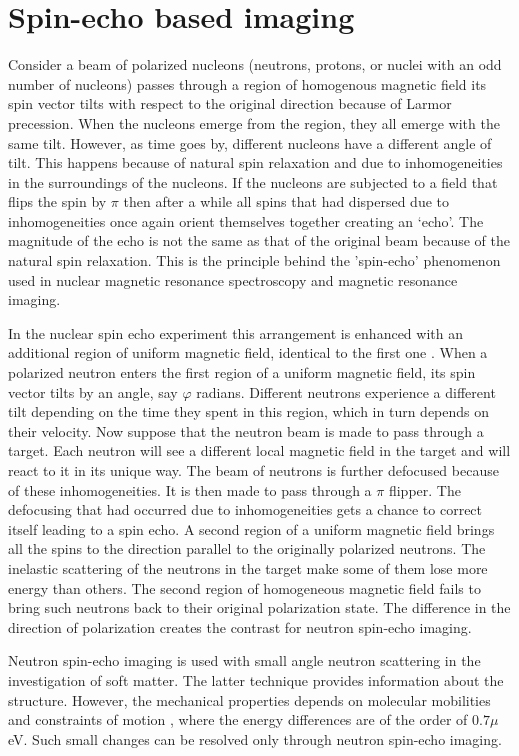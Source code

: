 \documentclass{article}
\numberwithin{equation}{section}
\begin{document}
\section{Spin-echo based imaging}\label{s12}
Consider a beam of polarized nucleons (neutrons, protons, or nuclei with an odd
number of nucleons) passes through a region of homogenous magnetic field its
spin vector tilts with respect to the original direction because of Larmor
precession. When the nucleons emerge from the region, they all emerge with the
same tilt. However, as time goes by, different nucleons have a different angle
of tilt. This happens because of natural spin relaxation and due to 
inhomogeneities in the surroundings of the nucleons. If the nucleons are 
subjected to a field that flips the spin by $\pi$ then after a while all spins
that had dispersed due to inhomogeneities once again orient themselves together
creating an `echo'. The magnitude of the echo is not the same as that of the
original beam because of the natural spin relaxation. This is the principle
behind the 'spin-echo' phenomenon used in nuclear magnetic resonance 
spectroscopy and magnetic resonance imaging.

In the nuclear spin echo experiment this arrangement is enhanced with an 
additional region of uniform magnetic field, identical to the first one
\cite{mezei1972neutron}. When a polarized neutron enters the first region
of a uniform magnetic field, its spin vector tilts by an angle, say $\varphi$
radians. Different neutrons experience a different tilt depending on the 
time they spent in this region, which in turn depends on their velocity. Now
suppose that the neutron beam is made to pass through a target. Each neutron
will see a different local magnetic field in the target and will react to it
in its unique way. The beam of neutrons is further defocused because of these
inhomogeneities. It is then made to pass through a $\pi$ flipper. The 
defocusing that had occurred due to inhomogeneities gets a chance to correct
itself leading to a spin echo. A second region of a uniform magnetic field
brings all the spins to the direction parallel to the originally polarized
neutrons. The inelastic scattering of the neutrons in the target make some of
them lose more energy than others. The second region of homogeneous magnetic
field fails to bring such neutrons back to their original polarization state.
The difference in the direction of polarization creates the contrast for
neutron spin-echo imaging.

Neutron spin-echo imaging is used with small angle neutron scattering in the
investigation of soft matter. The latter technique provides information about
the structure. However, the mechanical properties depends on molecular 
mobilities and constraints of motion \cite{monkenbusch2007high}, where the
energy differences are of the order of $0.7 \mu$eV. Such small changes can be
resolved only through neutron spin-echo imaging.
\end{document}
